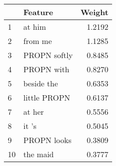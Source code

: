 \begin{tabular}{llr}
\toprule
{} &       Feature &  Weight \\
\midrule
1  &        at him &  1.2192 \\
2  &       from me &  1.1285 \\
3  &  PROPN softly &  0.8485 \\
4  &    PROPN with &  0.8270 \\
5  &    beside the &  0.6353 \\
6  &  little PROPN &  0.6137 \\
7  &        at her &  0.5556 \\
8  &         it 's &  0.5045 \\
9  &   PROPN looks &  0.3809 \\
10 &      the maid &  0.3777 \\
\bottomrule
\end{tabular}
